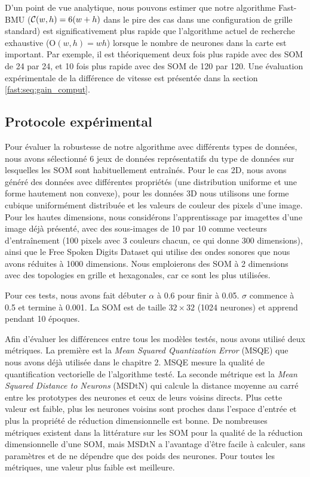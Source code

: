 	D'un point de vue analytique, nous pouvons estimer que notre algorithme Fast-BMU (${\cal C}(w,h)=6(w+h)$ dans le pire des cas dans une configuration de grille standard) est significativement plus rapide que l'algorithme actuel de recherche exhaustive (O$(w,h) = wh$) lorsque le nombre de neurones dans la carte est important. Par exemple, il est théoriquement deux fois plus rapide avec des SOM de 24 par 24, et 10 fois plus rapide avec des SOM de 120 par 120. Une évaluation expérimentale de la différence de vitesse est présentée dans la section \ref{fast:seq:gain_comput}.

	\subsection{Protocole expérimental}\label{seq:exp}

	Pour évaluer la robustesse de notre algorithme avec différents types de données, nous avons sélectionné 6 jeux de données représentatifs du type de données sur lesquelles les SOM sont habituellement entraînés. Pour le cas 2D, nous avons généré des données avec différentes propriétés (une distribution uniforme et une forme hautement non convexe), pour les données 3D nous utilisons une forme cubique uniformément distribuée et les valeurs de couleur des pixels d'une image. Pour les hautes dimensions, nous considérons l'apprentissage par imagettes d'une image déjà présenté, avec des sous-images de 10 par 10 comme vecteurs d'entraînement (100 pixels avec 3 couleurs chacun, ce qui donne 300 dimensions), ainsi que le Free Spoken Digits Dataset \cite{zohar_jackson_2018_1342401} qui utilise des ondes sonores que nous avons réduites à 1000 dimensions. Nous emploierons des SOM à 2 dimensions avec des topologies en grille et hexagonales, car ce sont les plus utilisées.

	Pour ces tests, nous avons fait débuter $\alpha$ à 0.6 pour finir à 0.05. $\sigma$ commence à 0.5 et termine à 0.001. La SOM est de taille $32\times32$ (1024 neurones) et apprend pendant 10 époques.

	Afin d'évaluer les différences entre tous les modèles testés, nous avons utilisé deux métriques. La première est la \textit{Mean Squared Quantization Error} (MSQE) que nous avons déjà utilisée dans le chapitre 2. MSQE mesure la qualité de quantification vectorielle de l'algorithme testé. La seconde métrique est la \textit{Mean Squared Distance to Neurons} (MSDtN) qui calcule la distance moyenne au carré entre les prototypes des neurones et ceux de leurs voisins directs. Plus cette valeur est faible, plus les neurones voisins sont proches dans l'espace d'entrée et plus la propriété de réduction dimensionnelle est bonne. De nombreuses métriques existent dans la littérature sur les SOM pour la qualité de la réduction dimensionnelle d'une SOM, mais MSDtN a l'avantage d'être facile à calculer, sans paramètres et de ne dépendre que des poids des neurones. Pour toutes les métriques, une valeur plus faible est meilleure. 

